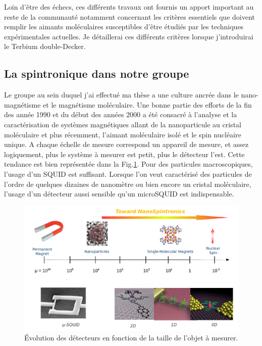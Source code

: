 Loin d'\^etre des échecs, ces différents travaux ont fournis un apport important au reste de la communauté notamment concernant les critères essentiels que doivent remplir les aimants moléculaires susceptibles d'être étudiés par les techniques expérimentales actuelles. Je détaillerai ces différents critères lorsque j'introduirai le Terbium double-Decker.
 
\subsection{La spintronique dans notre groupe}
Le groupe au sein duquel j'ai effectué ma thèse a une culture ancrée dans le nano-magnétisme et le magnétisme moléculaire. Une bonne partie des efforts de la fin des année 1990 et du début des années 2000 a été consacré à l'analyse et la caractérisation de systèmes magnétiques allant de la nanoparticule au cristal moléculaire  et plus récemment, l'aimant moléculaire isolé et le spin nucléaire unique. A chaque échelle de mesure correspond un appareil de mesure, et assez logiquement, plus le système à mesurer est petit, plus le détecteur l'est. Cette tendance est bien représentée dans la Fig.\ref{Group1}. Pour des particules macroscopiques, l'usage d'un SQUID est suffisant. Lorsque l'on veut caractérisé des particules de l'ordre de quelques dizaines de nanomètre ou bien encore un cristal moléculaire, l'usage d'un détecteur aussi sensible qu'un microSQUID est indispensable.


\begin{figure}
\centering \includegraphics[scale=0.45]{Spintronique/Group1/Group1.pdf}
\caption{\'Evolution des détecteurs en fonction de la taille de l'objet à mesurer.}
\label{Group1}
\end{figure}



